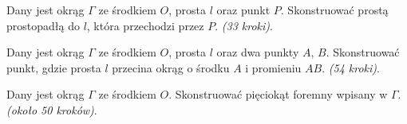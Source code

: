 \begin{problem}
    Dany jest okrąg $\Gamma$ ze środkiem $O$, prosta $l$ oraz punkt $P$.
    Skonstruować prostą prostopadłą do $l$, która przechodzi przez $P$. \hfill \emph{(33 kroki)}. %
\end{problem}

\begin{problem}
    Dany jest okrąg $\Gamma$ ze środkiem $O$, prosta $l$ oraz dwa punkty $A$, $B$.
    Skonstruować punkt, gdzie prosta $l$ przecina okrąg o środku $A$ i promieniu $AB$. \hfill \emph{(54 kroki)}. %
\end{problem}

\begin{problem}
    Dany jest okrąg $\Gamma$ ze środkiem $O$.
    Skonstruować pięciokąt foremny wpisany w $\Gamma$. \hfill \emph{(około 50 kroków)}. %
\end{problem}